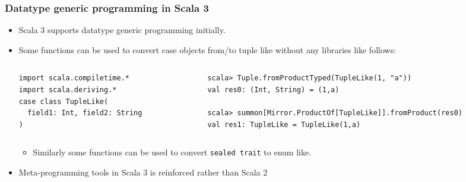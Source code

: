 \begin{frame}[fragile]
  \frametitle{Datatype generic programming in Scala 3}

  \pause
  \begin{itemize}
    \item<+-> Scala 3 supports datatype generic programming initially.
    
    \item<+-> Some functions can be used to convert case objects from/to tuple like without any libraries like follows:
    \begin{columns}
      \begin{column}{0.32\textwidth}
\begin{lstlisting}[style=scala]
import scala.compiletime.*
import scala.deriving.*
case class TupleLike(
  field1: Int, field2: String
)
\end{lstlisting}
      \end{column}
      \begin{column}{0.6\textwidth}
\begin{lstlisting}[style=scala]
scala> Tuple.fromProductTyped(TupleLike(1, "a"))
val res0: (Int, String) = (1,a)

scala> summon[Mirror.ProductOf[TupleLike]].fromProduct(res0)
val res1: TupleLike = TupleLike(1,a)
\end{lstlisting}
      \end{column}
    \end{columns}
    \begin{itemize}
      \item Similarly some functions can be used to convert \lstinline|sealed trait| to enum like.
    \end{itemize}

    \item<+-> Meta-programming tools in Scala 3 is reinforced rather than Scala 2
  \end{itemize}

\end{frame}

